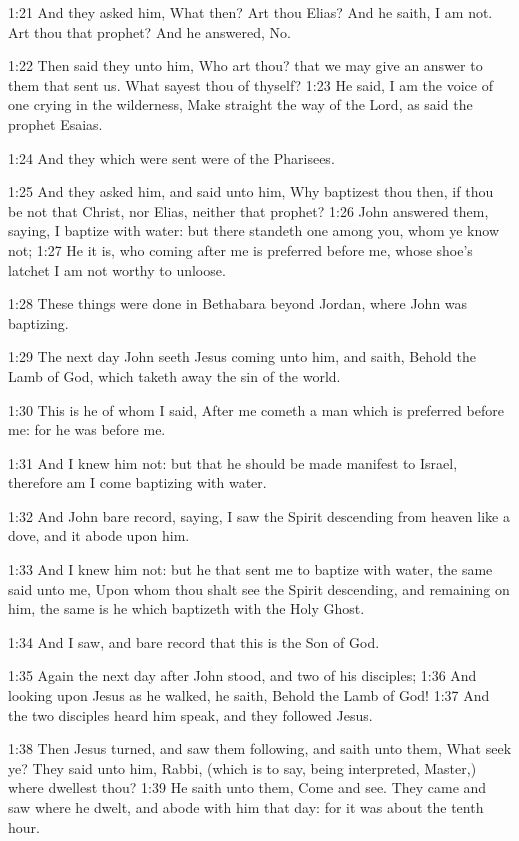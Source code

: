 1:21 And they asked him, What then? Art thou Elias? And he saith, I am
not. Art thou that prophet? And he answered, No.

1:22 Then said they unto him, Who art thou? that we may give an answer
to them that sent us. What sayest thou of thyself?  1:23 He said, I am
the voice of one crying in the wilderness, Make straight the way of
the Lord, as said the prophet Esaias.

1:24 And they which were sent were of the Pharisees.

1:25 And they asked him, and said unto him, Why baptizest thou then,
if thou be not that Christ, nor Elias, neither that prophet?  1:26
John answered them, saying, I baptize with water: but there standeth
one among you, whom ye know not; 1:27 He it is, who coming after me is
preferred before me, whose shoe's latchet I am not worthy to unloose.

1:28 These things were done in Bethabara beyond Jordan, where John was
baptizing.

1:29 The next day John seeth Jesus coming unto him, and saith, Behold
the Lamb of God, which taketh away the sin of the world.

1:30 This is he of whom I said, After me cometh a man which is
preferred before me: for he was before me.

1:31 And I knew him not: but that he should be made manifest to
Israel, therefore am I come baptizing with water.

1:32 And John bare record, saying, I saw the Spirit descending from
heaven like a dove, and it abode upon him.

1:33 And I knew him not: but he that sent me to baptize with water,
the same said unto me, Upon whom thou shalt see the Spirit descending,
and remaining on him, the same is he which baptizeth with the Holy
Ghost.

1:34 And I saw, and bare record that this is the Son of God.

1:35 Again the next day after John stood, and two of his disciples;
1:36 And looking upon Jesus as he walked, he saith, Behold the Lamb of
God!  1:37 And the two disciples heard him speak, and they followed
Jesus.

1:38 Then Jesus turned, and saw them following, and saith unto them,
What seek ye? They said unto him, Rabbi, (which is to say, being
interpreted, Master,) where dwellest thou?  1:39 He saith unto them,
Come and see. They came and saw where he dwelt, and abode with him
that day: for it was about the tenth hour.

